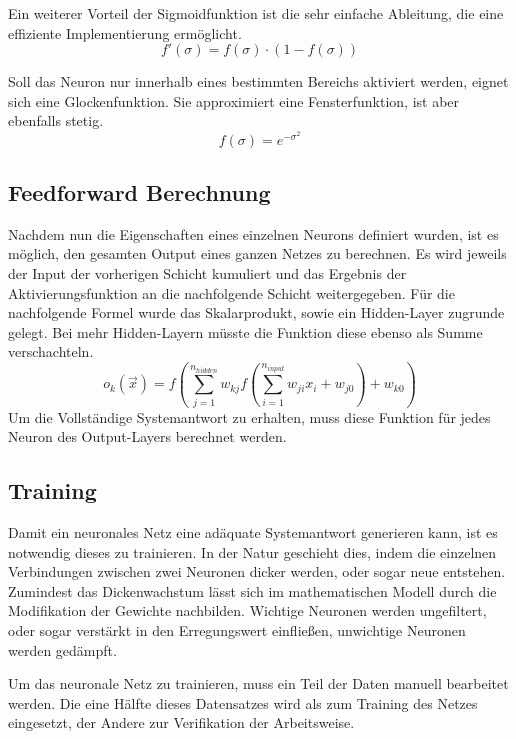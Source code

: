 Ein weiterer Vorteil der Sigmoidfunktion ist die sehr einfache Ableitung, die eine effiziente Implementierung ermöglicht.
\begin{equation}
f'(\sigma) = f(\sigma)\cdot (1- f(\sigma))
\end{equation}

Soll das Neuron nur innerhalb eines bestimmten Bereichs aktiviert werden, eignet sich eine Glockenfunktion. Sie approximiert eine Fensterfunktion, ist aber ebenfalls stetig.
\begin{equation}
f(\sigma) = e^{-\sigma^2}
\end{equation}



\subsection{Feedforward Berechnung}
Nachdem nun die Eigenschaften eines einzelnen Neurons definiert wurden, ist es möglich, den gesamten Output eines ganzen Netzes zu berechnen.  Es wird jeweils der Input der vorherigen Schicht kumuliert und das Ergebnis der Aktivierungsfunktion an die nachfolgende Schicht weitergegeben. Für die nachfolgende Formel wurde das Skalarprodukt, sowie ein Hidden-Layer zugrunde gelegt. Bei mehr Hidden-Layern müsste die Funktion diese ebenso als Summe verschachteln.
\begin{equation}
o_{k}(\vec{x})=f\left( \sum_{j=1}^{n_{hidden}} w_{kj} f\left(\sum_{i=1}^{n_{input}} w_{ji}x_{i}+w_{j0} \right)+w_{k0} \right)
\end{equation}
Um die Vollständige Systemantwort zu erhalten, muss diese Funktion für jedes Neuron des Output-Layers berechnet werden.

\subsection{Training}

Damit ein neuronales Netz eine adäquate Systemantwort generieren kann, ist es notwendig dieses zu trainieren. In der Natur geschieht dies, indem die einzelnen Verbindungen zwischen zwei Neuronen dicker werden, oder sogar neue entstehen. Zumindest das Dickenwachstum lässt sich im mathematischen Modell durch die Modifikation der Gewichte nachbilden. Wichtige Neuronen werden ungefiltert, oder sogar verstärkt in den Erregungswert einfließen, unwichtige Neuronen werden gedämpft.

Um das neuronale Netz zu trainieren, muss ein Teil der Daten manuell bearbeitet werden. Die eine Hälfte dieses Datensatzes wird als zum Training des Netzes eingesetzt, der Andere zur Verifikation der Arbeitsweise.
 
